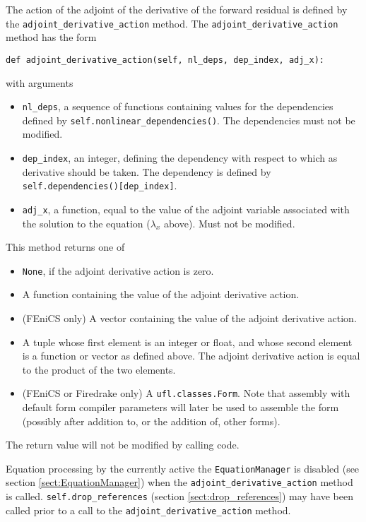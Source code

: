 \documentclass[11pt]{article}
\begin{document}
The action of the adjoint of the derivative of the forward residual is defined
by the \texttt{adjoint\_derivative\_action} method. The
\texttt{adjoint\_derivative\_action} method has the form
\begin{lstlisting}
def adjoint_derivative_action(self, nl_deps, dep_index, adj_x):
\end{lstlisting}
with arguments
\begin{itemize}
  \item \texttt{nl\_deps}, a sequence of functions containing values for the
    dependencies defined by \texttt{self.nonlinear\_dependencies()}. The
    dependencies must not be modified.
  \item \texttt{dep\_index}, an integer, defining the dependency with respect
    to which as derivative should be taken. The dependency is defined by
    \texttt{self.dependencies()[dep\_index]}.
  \item \texttt{adj\_x}, a function, equal to the value of the adjoint variable
    associated with the solution to the equation ($\lambda_x$ above). Must not
    be modified.
\end{itemize}
This method returns one of
\begin{itemize}
  \item \texttt{None}, if the adjoint derivative action is zero.
  \item A function containing the value of the adjoint derivative action.
  \item (FEniCS only) A vector containing the value of the adjoint derivative
    action.
  \item A tuple whose first element is an integer or float, and whose second
    element is a function or vector as defined above. The adjoint derivative
    action is equal to the product of the two elements.
  \item (FEniCS or Firedrake only) A \texttt{ufl.classes.Form}. Note that
    assembly with default form compiler parameters will later be used to
    assemble the form (possibly after addition to, or the addition of, other
    forms).
\end{itemize}
The return value will not be modified by calling code.

Equation processing by the currently active the \texttt{EquationManager} is
disabled (see section \ref{sect:EquationManager}) when the
\texttt{adjoint\_derivative\_action} method is called.
\texttt{self.drop\_references} (section \ref{sect:drop_references}) may have
been called prior to a call to the \texttt{adjoint\_derivative\_action} method.
\end{document}
